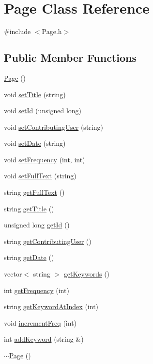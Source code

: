 \hypertarget{class_page}{}\section{Page Class Reference}
\label{class_page}


{\ttfamily \#include $<$Page.\+h$>$}

\subsection*{Public Member Functions}
\begin{DoxyCompactItemize}
\item 
\hyperlink{class_page_a9a7cc22d5459498ce638c54ae966c79b}{Page} ()
\item 
void \hyperlink{class_page_acf477f6eb17bab9955041f62cf773e8d}{set\+Title} (string)
\item 
void \hyperlink{class_page_ac482ec0d499e8c4d61f65bec3c845e05}{set\+Id} (unsigned long)
\item 
void \hyperlink{class_page_aa035203c86eb29a7121987ef5bfa1faf}{set\+Contributing\+User} (string)
\item 
void \hyperlink{class_page_a12df427d5f2620b2e912590eb1c81d32}{set\+Date} (string)
\item 
void \hyperlink{class_page_ada78e7ad8b4111afa5dd503151946e70}{set\+Frequency} (int, int)
\item 
void \hyperlink{class_page_a3f82c5cc09e31dc064246984ce7b7c17}{set\+Full\+Text} (string)
\item 
string \hyperlink{class_page_ad9647bb36d7587217dae9039aaf9d0db}{get\+Full\+Text} ()
\item 
string \hyperlink{class_page_ad8984dc2ec1c9d62343e35724080ee46}{get\+Title} ()
\item 
unsigned long \hyperlink{class_page_a8ce274bdff4b0f02131b0142dfd38dde}{get\+Id} ()
\item 
string \hyperlink{class_page_aa21e1e663df6f64d0670f4f9ac97330c}{get\+Contributing\+User} ()
\item 
string \hyperlink{class_page_aa9f674aaecb16f3ef02d54d0e42abe49}{get\+Date} ()
\item 
vector$<$ string $>$ \hyperlink{class_page_a31af27b5aa8f44f6bfb95fdbf555477c}{get\+Keywords} ()
\item 
int \hyperlink{class_page_a34588144ffb1c839e179f43aa7d9977c}{get\+Frequency} (int)
\item 
string \hyperlink{class_page_a0b43e8cd80b96011df19d083e6436a0f}{get\+Keyword\+At\+Index} (int)
\item 
void \hyperlink{class_page_a5650ea40b701dd7e15c7aa90fc819358}{increment\+Freq} (int)
\item 
int \hyperlink{class_page_a16d01583e3275c3a3c30793408f9865f}{add\+Keyword} (string \&)
\item 
\hyperlink{class_page_a2341fff1cc032ab6528874175e7dd841}{$\sim$\+Page} ()
\end{DoxyCompactItemize}
